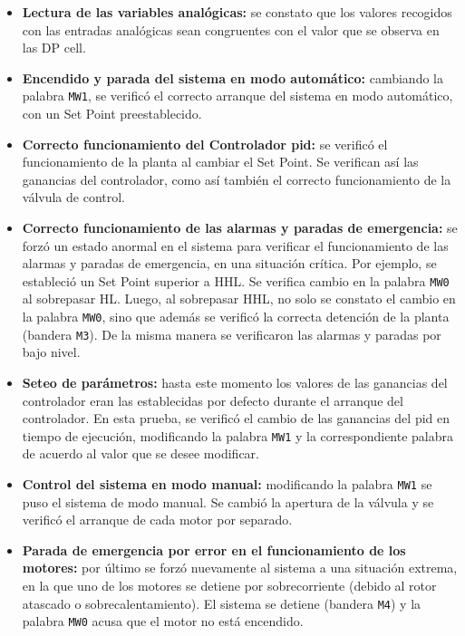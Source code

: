 \begin{itemize}
 \item \textbf{Lectura de las variables analógicas:}
 se constato que los valores recogidos con las entradas analógicas sean
congruentes con el valor que se observa en las DP cell.

  \item \textbf{Encendido y parada del sistema en modo automático:} cambiando
la palabra \verb|MW1|, se verificó el correcto arranque del sistema en modo
automático, con un Set Point preestablecido.

 \item \textbf{Correcto funcionamiento del Controlador \gls{pid}:}
 se verificó el funcionamiento de la planta al cambiar el Set Point.
Se verifican así las ganancias del controlador, como así también el correcto
funcionamiento de la válvula de control.

 \item \textbf{Correcto funcionamiento de las alarmas y paradas de emergencia:}
 se forzó un estado anormal en el sistema para verificar el funcionamiento de
las alarmas y paradas de emergencia, en una situación crítica. Por ejemplo, se
estableció un Set Point superior a HHL.
 Se verifica cambio en la palabra \verb|MW0| al sobrepasar HL.
 Luego, al sobrepasar HHL, no solo se constato el cambio en la
 palabra \verb|MW0|, sino que además se verificó la correcta detención de la
planta (bandera \verb|M3|).
 De la misma manera se verificaron las alarmas y paradas por bajo nivel.
 
 \item \textbf{Seteo de parámetros:}
 hasta este momento los valores de las ganancias del controlador eran las
establecidas por defecto durante el arranque del controlador.
 En esta prueba, se verificó el cambio de las ganancias del \gls{pid} en tiempo
de ejecución, modificando la palabra \verb|MW1| y la
correspondiente palabra de acuerdo al valor que se desee modificar.
 
 \item \textbf{Control del sistema en modo manual:}
 modificando la palabra \verb|MW1| se puso el sistema de modo manual.
 Se cambió la apertura de la válvula y se verificó el arranque de cada motor
por separado.
 
 \item \textbf{Parada de emergencia por error en el funcionamiento de los
motores:} por último se forzó nuevamente al sistema a una situación extrema, en
la que uno de los motores se detiene por sobrecorriente (debido al rotor
atascado o sobrecalentamiento).
 El sistema se detiene (bandera \verb|M4|) y la palabra \verb|MW0| acusa que el
motor no está encendido.
\end{itemize}
